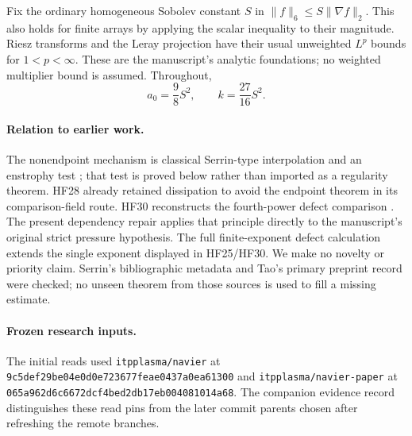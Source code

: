 \documentclass[11pt,a4paper]{article}
\theoremstyle{definition}\newtheorem{hypothesis}[theorem]{Hypothesis}
\theoremstyle{remark}\newtheorem{remark}[theorem]{Remark}
\newcommand{\norm}[1]{\lVert #1\rVert}
\numberwithin{equation}{section}
\begin{document}
Fix the ordinary homogeneous Sobolev constant $S$ in
$\norm f_6\le S\norm{\nabla f}_2$. This also holds for finite arrays by
applying the scalar inequality to their magnitude. Riesz transforms and the
Leray projection have their usual unweighted $L^p$ bounds for $1<p<\infty$.
These are the manuscript's analytic foundations; no weighted multiplier
bound is assumed. Throughout,
\begin{equation}\label{db:constants}
 a_0=\frac98S^2,\qquad k=\frac{27}{16}S^2.
\end{equation}

\paragraph{Relation to earlier work.}
The nonendpoint mechanism is classical Serrin-type interpolation and an
enstrophy test \cite{serrin}; that test is proved below rather than imported
as a regularity theorem. HF28 already retained dissipation to avoid the
endpoint theorem in its comparison-field route. HF30 reconstructs the
fourth-power defect comparison \cite{hf28,hf30}. The present dependency
repair applies that principle directly to the manuscript's original strict
pressure hypothesis. The full finite-exponent defect calculation extends the
single exponent displayed in HF25/HF30. We make no novelty or priority claim.
Serrin's bibliographic metadata and Tao's primary preprint record were checked;
no unseen theorem from those sources is used to fill a missing estimate.

\paragraph{Frozen research inputs.}
The initial reads used \texttt{itpplasma/navier} at
\nolinkurl{9c5def29be04e0d0e723677feae0437a0ea61300} and
\texttt{itpplasma/navier-paper} at
\nolinkurl{065a962d6c6672dcf4bed2db17eb004081014a68}.
The companion evidence record distinguishes these read pins from the later
commit parents chosen after refreshing the remote branches.
\end{document}
